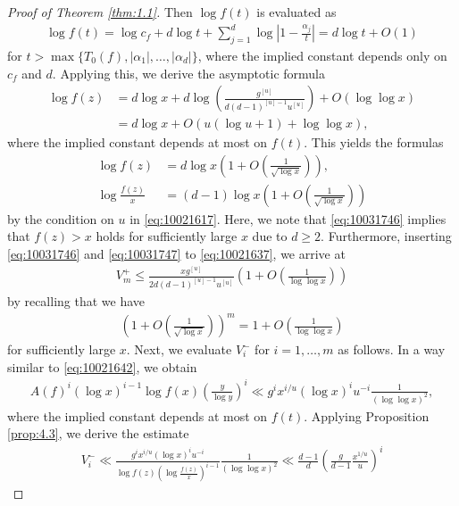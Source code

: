 \documentclass[a4paper,11pt]{amsart}
\theoremstyle{definition}
\numberwithin{equation}{section}
\begin{document}
\begin{proof}[Proof of Theorem \ref{thm:1.1}]
Then $\log{f(t)}$ is evaluated as 
\begin{align*}
\log{f(t)}
= \log{c_f}
+ d \log{t} 
+ \sum_{j=1}^{d} \log\left|1-\frac{\alpha_j}{t}\right| 
= d \log{t}+O(1)
\end{align*}
for $t>\max\{T_0(f),|\alpha_1|,\ldots,|\alpha_d|\}$, where the implied constant depends only on $c_f$ and $d$. 
Applying this, we derive the asymptotic formula
\begin{align*}
\log{f(z)}
&= d \log{x} 
+ d \log\left(\frac{g^{[u]}}{d(d-1)^{[u]-1}u^{[u]}}\right)
+ O(\log\log{x}) \\ 
&= d \log{x}
+ O\left(u (\log{u}+1) +\log\log{x}\right), 
\end{align*}
where the implied constant depends at most on $f(t)$. 
This yields the formulas
\begin{align}
\log{f(z)}
&= d \log{x} \left(1+O\left(\frac{1}{\sqrt{\log{x}}}\right)\right), \label{eq:10031746} \\
\log{\frac{f(z)}{x}}
&= (d-1) \log{x} \left(1+O\left(\frac{1}{\sqrt{\log{x}}}\right)\right) \label{eq:10031747} 
\end{align}
by the condition on $u$ in \eqref{eq:10021617}. 
Here, we note that \eqref{eq:10031746} implies that $f(z)>x$ holds for sufficiently large $x$ due to $d \geq2$. 
Furthermore, inserting \eqref{eq:10031746} and \eqref{eq:10031747} to \eqref{eq:10021637}, we arrive at
\begin{align*}
V_m^+
\leq \frac{x g^{[u]}}{2d(d-1)^{[u]-1} u^{[u]}} 
\left(1+O\left(\frac{1}{\log\log{x}}\right)\right) 
\end{align*}
by recalling that we have
\begin{align*}
\left(1+O\left(\frac{1}{\sqrt{\log{x}}}\right)\right)^m
= 1+O\left(\frac{1}{\log\log{x}}\right)
\end{align*}
for sufficiently large $x$. 
Next, we evaluate $V_i^-$ for $i=1,\ldots,m$ as follows. 
In a way similar to \eqref{eq:10021642}, we obtain
\begin{align*}
A(f)^i (\log{x})^{i-1} \log{f(x)} \left(\frac{y}{\log{y}}\right)^i
\ll g^i x^{i/u}  (\log{x})^i u^{-i} \frac{1}{(\log\log{x})^2}, 
\end{align*}
where the implied constant depends at most on $f(t)$. 
Applying Proposition \ref{prop:4.3}, we derive the estimate
\begin{align*}
V_i^-
\ll \frac{g^i x^{i/u}  (\log{x})^i u^{-i}}{\log{f(z)} \left(\log{\frac{f(z)}{x}}\right)^{i-1}}
\frac{1}{(\log\log{x})^2}
\ll \frac{d-1}{d} \left(\frac{g}{d-1}\frac{x^{1/u}}{u}\right)^i 

\end{align*}
\end{proof}
\end{document}
